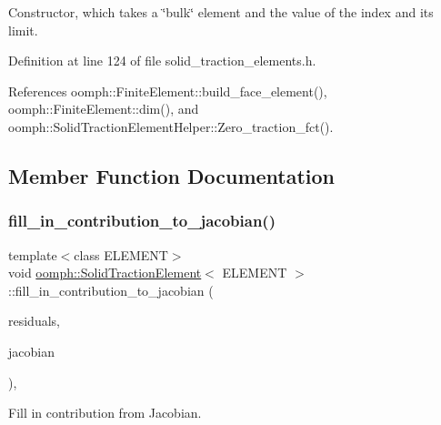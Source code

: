Constructor, which takes a \char`\"{}bulk\char`\"{} element and the value of the index and its limit. 



Definition at line 124 of file solid\+\_\+traction\+\_\+elements.\+h.



References oomph\+::\+Finite\+Element\+::build\+\_\+face\+\_\+element(), oomph\+::\+Finite\+Element\+::dim(), and oomph\+::\+Solid\+Traction\+Element\+Helper\+::\+Zero\+\_\+traction\+\_\+fct().



\subsection{Member Function Documentation}
\mbox{\label{classoomph_1_1SolidTractionElement_a7f6315287b8d863631a06b75e0cc7daf}} 
\subsubsection{\texorpdfstring{fill\+\_\+in\+\_\+contribution\+\_\+to\+\_\+jacobian()}{fill\_in\_contribution\_to\_jacobian()}}
{\footnotesize\ttfamily template$<$class E\+L\+E\+M\+E\+NT$>$ \\
void \hyperlink{classoomph_1_1SolidTractionElement}{oomph\+::\+Solid\+Traction\+Element}$<$ E\+L\+E\+M\+E\+NT $>$\+::fill\+\_\+in\+\_\+contribution\+\_\+to\+\_\+jacobian (\begin{DoxyParamCaption}\item[{\hyperlink{classoomph_1_1Vector}{Vector}$<$ double $>$ \&}]{residuals,  }\item[{\hyperlink{classoomph_1_1DenseMatrix}{Dense\+Matrix}$<$ double $>$ \&}]{jacobian }\end{DoxyParamCaption})\hspace{0.3cm}{\ttfamily [inline]}, {\ttfamily [virtual]}}



Fill in contribution from Jacobian. 



